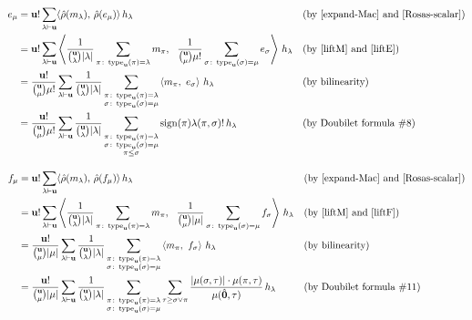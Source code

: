 \begin{align*}
e_\mu &=  \mathbf{u}! \sum_{\lambda\vdash\mathbf{u}} \langle \hat\rho(m_\lambda),\,\hat\rho(e_\mu)\rangle\, h_\lambda
	&&\text{(by~\eqref{expand-Mac} and~\eqref{Rosas-scalar})}\\
&=  \mathbf{u}! \sum_{\lambda\vdash\mathbf{u}} \left\langle \frac{1}{\binom{\mathbf{u}}{\lambda}|\lambda|} \sum_{\pi\colon \operatorname{type}_{\mathbf{u}}(\pi)=\lambda} m_\pi, \ \ \frac{1}{\binom{\mathbf{u}}{\mu}\mu!} \sum_{\sigma\colon \operatorname{type}_{\mathbf{u}}(\sigma)=\mu} e_\sigma \right\rangle\, h_\lambda
	&&\text{(by~\eqref{liftM} and~\eqref{liftE})}\\
&= \frac{\mathbf{u}!}{\binom{\mathbf{u}}{\mu}\mu!} \sum_{\lambda\vdash\mathbf{u}} \frac{1}{\binom{\mathbf{u}}{\lambda}|\lambda|}
    \sum_{\substack{\pi\colon \operatorname{type}_{\mathbf{u}}(\pi)=\lambda\\ \sigma\colon \operatorname{type}_{\mathbf{u}}(\sigma)=\mu}}
    \left\langle m_\pi,\ e_\sigma \right\rangle\, h_\lambda
	&&\text{(by bilinearity)}\\
&= \frac{\mathbf{u}!}{\binom{\mathbf{u}}{\mu}\mu!} \sum_{\lambda\vdash\mathbf{u}} \frac{1}{\binom{\mathbf{u}}{\lambda}|\lambda|}
    \sum_{\substack{\pi\colon \operatorname{type}_{\mathbf{u}}(\pi)=\lambda\\ \sigma\colon \operatorname{type}_{\mathbf{u}}(\sigma)=\mu\\ \pi\leq\sigma}}
    \operatorname{sign}(\pi) \lambda(\pi,\sigma)!\, h_\lambda
	&&\text{(by Doubilet formula \#8)}\\
\end{align*}

\begin{align*}
f_\mu &=  \mathbf{u}! \sum_{\lambda\vdash\mathbf{u}} \langle \hat\rho(m_\lambda),\,\hat\rho(f_\mu)\rangle\, h_\lambda
	&&\text{(by~\eqref{expand-Mac} and~\eqref{Rosas-scalar})}\\
&=  \mathbf{u}! \sum_{\lambda\vdash\mathbf{u}} \left\langle \frac{1}{\binom{\mathbf{u}}{\lambda}|\lambda|} \sum_{\pi\colon \operatorname{type}_{\mathbf{u}}(\pi)=\lambda} m_\pi, \ \ \frac{1}{\binom{\mathbf{u}}{\mu}|\mu|} \sum_{\sigma\colon \operatorname{type}_{\mathbf{u}}(\sigma)=\mu} f_\sigma \right\rangle\, h_\lambda
	&&\text{(by~\eqref{liftM} and~\eqref{liftF})}\\
&= \frac{\mathbf{u}!}{\binom{\mathbf{u}}{\mu}|\mu|} \sum_{\lambda\vdash\mathbf{u}} \frac{1}{\binom{\mathbf{u}}{\lambda}|\lambda|}
    \sum_{\substack{\pi\colon \operatorname{type}_{\mathbf{u}}(\pi)=\lambda\\ \sigma\colon \operatorname{type}_{\mathbf{u}}(\sigma)=\mu}}
    \left\langle m_\pi,\ f_\sigma \right\rangle\, h_\lambda
	&&\text{(by bilinearity)}\\
&= \frac{\mathbf{u}!}{\binom{\mathbf{u}}{\mu}|\mu|} \sum_{\lambda\vdash\mathbf{u}} \frac{1}{\binom{\mathbf{u}}{\lambda}|\lambda|}
    \sum_{\substack{\pi\colon \operatorname{type}_{\mathbf{u}}(\pi)=\lambda\\ \sigma\colon \operatorname{type}_{\mathbf{u}}(\sigma)=\mu}}
    \sum_{\tau\geq\sigma\vee\pi} \frac{|\mu(\sigma,\tau)|\cdot\mu(\pi,\tau)}{\mu(\hat{\mathbf{0}},\tau)}\, h_\lambda
	&&\text{(by Doubilet formula \#11)}\\
\end{align*}

